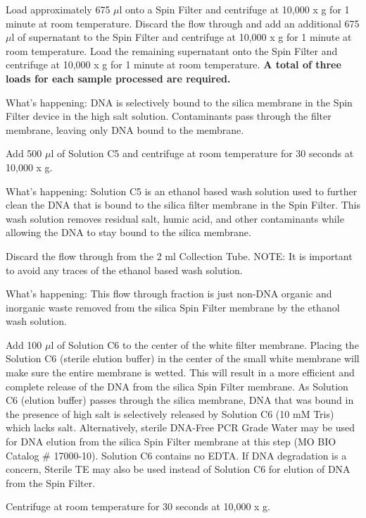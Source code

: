 \documentclass[12pt]{../SOP3_alpha}\usepackage[]{graphicx}\usepackage[]{color}
\begin{document}
\NP Load approximately 675 $\mu$l onto a Spin Filter and centrifuge at 10,000 x g for 1 minute at room temperature. Discard the flow through and add an additional 675 $\mu$l of supernatant to the Spin Filter and centrifuge at 10,000 x g for 1 minute at room temperature. Load the remaining supernatant onto the Spin Filter and centrifuge at 10,000 x g for 1 minute at room temperature. \textbf{A total of three loads for each sample processed are required.}

\noindent What's happening: DNA is selectively bound to the silica membrane in the Spin Filter device in the high salt solution. Contaminants pass through the
filter membrane, leaving only DNA bound to the membrane.

\NP Add 500 $\mu$l of Solution C5 and centrifuge at room temperature for 30 seconds at 10,000 x g.

\noindent What's happening: Solution C5 is an ethanol based wash solution used to further clean the DNA that is bound to the silica filter membrane in the Spin Filter. This wash solution removes residual salt, humic acid, and other contaminants while allowing the DNA to stay bound to the silica membrane.

\NP Discard the flow through from the 2 ml Collection Tube. NOTE: It is important to avoid any traces of the ethanol based wash solution.

\noindent What's happening: This flow through fraction is just non-DNA organic and inorganic waste removed from the silica Spin Filter membrane by the ethanol wash solution.


\NP Add 100 $\mu$l of Solution C6 to the center of the white filter membrane. Placing the Solution C6 (sterile elution buffer) in the center of the small white membrane will make sure the entire membrane is wetted. This will result in a more efficient and complete release of the DNA from the silica Spin Filter membrane. As Solution C6 (elution buffer) passes through the silica membrane, DNA that was bound in the presence of high salt is selectively released by Solution C6 (10 mM Tris) which lacks salt. Alternatively, sterile DNA-Free PCR Grade Water may be used for DNA elution from the silica Spin Filter membrane at this step (MO BIO Catalog \# 17000-10). Solution C6 contains no EDTA. If DNA degradation is a concern, Sterile TE may also be used instead of Solution C6 for elution of DNA from the Spin Filter.


\NP Centrifuge at room temperature for 30 seconds at 10,000 x g.
\end{document}
